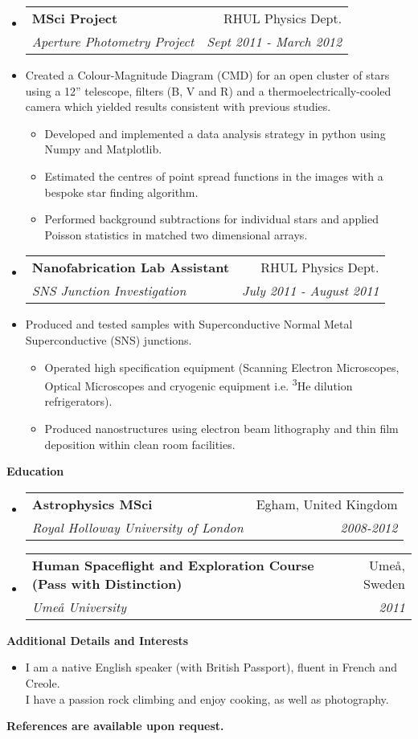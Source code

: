 \documentclass[letterpaper,11pt]{article}
\makeatletter
\newcommand{\resitem}[1]{\item #1 \vspace{-2pt}}
\newcommand{\resheading}[1]{{\large \colorbox{mygrey}
			{\begin{minipage}{\textwidth}
					{\textbf{#1 \vphantom{p\^{E}}}}
		\end{minipage}}}
	}
\newcommand{\ressubheading}[4]{
		\begin{tabular*}{180mm}{l@{\extracolsep{\fill}}r}
			\textbf{#1} & #2 \\
			\textit{#3} & \textit{#4} \\
		\end{tabular*}\vspace{-6pt}
	}
\newcommand{\resdescription}[1]{#1 \vspace{-0mm}}
\makeatother
\begin{document}
\begin{itemize}
		\item[]
			\ressubheading{MSci Project}{RHUL Physics Dept.}{Aperture Photometry Project}{Sept 2011 - March 2012}
		\item[]
			\resdescription{Created a Colour-Magnitude Diagram (CMD) for an open cluster of stars using a 12'' telescope, filters (B, V and R) and a thermoelectrically-cooled camera which yielded results consistent with previous studies.}
			\begin{itemize}
					\resitem{Developed and implemented a data analysis strategy in python using Numpy and Matplotlib.}
					\resitem{Estimated the centres of point spread functions in the images with a bespoke star finding algorithm.}
					\resitem{Performed background subtractions for individual stars and applied Poisson statistics in matched two dimensional arrays.}
			\end{itemize}

		\item[]
			\ressubheading{Nanofabrication Lab Assistant}{RHUL Physics Dept.}{SNS Junction Investigation}{July 2011 - August 2011}
		\item[]
			\resdescription{Produced and tested samples with Superconductive Normal Metal Superconductive (SNS) junctions.}
			\begin{itemize}
					\resitem{Operated high specification equipment (Scanning Electron Microscopes, Optical Microscopes and cryogenic equipment i.e. \textsuperscript{3}He dilution refrigerators).}
					\resitem{Produced nanostructures using electron beam lithography and thin film deposition within clean room facilities.}
			\end{itemize}

	\end{itemize}

	\resheading{Education}
	\begin{itemize}
		\item[]
			\ressubheading{Astrophysics MSci }{Egham, United Kingdom}{Royal Holloway University of London}{2008-2012}

		\item[]
			\ressubheading{Human Spaceflight and Exploration Course (Pass with Distinction)}{Ume\r{a}, Sweden}{Ume\r{a} University}{2011}

	\end{itemize}

	\resheading{Additional Details and Interests}
	\begin{itemize}
		\item[] I am a native English speaker (with British Passport), fluent in French and Creole.\\
			I have a passion rock climbing and enjoy cooking, as well as photography. \\
	\end{itemize}

	\textbf{References are available upon request.}

	
\end{document}

